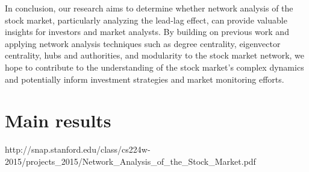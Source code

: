 \documentclass[onefignum,onetabnum]{siamart171218}
\begin{document}
In conclusion, our research aims to determine whether network analysis of the stock market, particularly analyzing the lead-lag effect, can provide valuable insights for investors and market analysts. By building on previous work and applying network analysis techniques such as degree centrality, eigenvector centrality, hubs and authorities, and modularity to the stock market network, we hope to contribute to the understanding of the stock market's complex dynamics and potentially inform investment strategies and market monitoring efforts.

\section{Main results}
\label{sec:main}




http://snap.stanford.edu/class/cs224w-2015/projects_2015/Network_Analysis_of_the_Stock_Market.pdf
\end{document}
